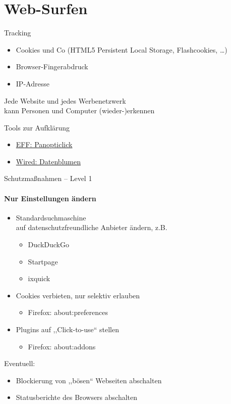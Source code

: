 \section{Web-Surfen}
\begin{frame}{Tracking}
  \begin{itemize}
    \item Cookies und Co (HTML5 Persistent Local Storage, Flashcookies, \ldots)
    \item Browser-Fingerabdruck
    \item IP-Adresse
  \end{itemize}
  Jede Website und jedes Werbenetzwerk\\kann Personen und Computer (wieder-)erkennen

  \begin{block}{Tools zur Aufklärung}
  \begin{itemize}
    \item \href{https://panopticlick.eff.org/}{EFF: Panopticlick}
    \item \href{http://datenblumen.wired.de/}{Wired: Datenblumen}
  \end{itemize}
  \end{block}
\end{frame}

\begin{frame}{Schutzmaßnahmen -- Level 1}
\framesubtitle{Nur Einstellungen ändern}
  \begin{itemize}
    \item Standardsuchmaschine\\ auf datenschutzfreundliche Anbieter ändern, z.B.
    \begin{itemize}
      \item DuckDuckGo
      \item Startpage
      \item ixquick
    \end{itemize}
    \item Cookies verbieten, nur selektiv erlauben
    \begin{itemize}
      \item Firefox: about:preferences
    \end{itemize}
    \item Plugins auf ,,Click-to-use`` stellen
    \begin{itemize}
      \item Firefox: about:addons
    \end{itemize}
  \end{itemize}

  Eventuell:
  \begin{itemize}
    \item Blockierung von ,,bösen`` Webseiten abschalten
    \item Statusberichte des Browsers abschalten
  \end{itemize}
\end{frame}

